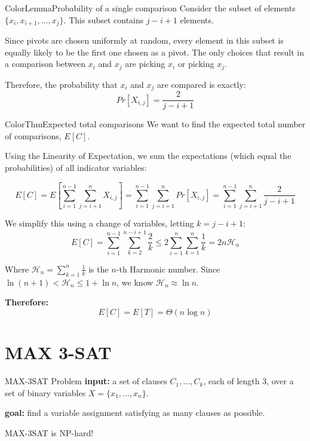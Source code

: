 \documentclass[a4paper, 11pt]{report}
\begin{document}
\begin{cframe}{ColorLemma}{Probability of a single comparison}
    Consider the subset of elements $\{x_i, x_{i+1}, \dots, x_j\}$. This subset contains $j - i + 1$ elements. 
    
    Since pivots are chosen uniformly at random, every element in this subset is equally likely to be the first one chosen as a pivot. The only choices that result in a comparison between $x_i$ and $x_j$ are picking $x_i$ or picking $x_j$. 
    
    Therefore, the probability that $x_i$ and $x_j$ are compared is exactly:
    $$Pr[X_{i,j}] = \frac{2}{j - i + 1}$$
\end{cframe}

\begin{cframe}{ColorThm}{Expected total comparisons}
    We want to find the expected total number of comparisons, $E[C]$. 

    Using the Linearity of Expectation, we sum the expectations (which equal the probabilities) of all indicator variables:
    
    $$E[C] = E\left[\sum_{i=1}^{n-1} \sum_{j=i+1}^n X_{i,j}\right] = \sum_{i=1}^{n-1} \sum_{j=i+1}^n Pr[X_{i,j}] = \sum_{i=1}^{n-1} \sum_{j=i+1}^n \frac{2}{j - i + 1}$$
    
    We simplify this using a change of variables, letting $k = j - i + 1$:
    $$E[C] = \sum_{i=1}^{n-1} \sum_{k=2}^{n-i+1} \frac{2}{k} \le 2 \sum_{i=1}^n \sum_{k=1}^n \frac{1}{k} = 2n\mathcal{H}_n$$
    
    Where $\mathcal{H}_n = \sum_{k=1}^n \frac{1}{k}$ is the $n$-th Harmonic number. Since $\ln(n+1) < \mathcal{H}_n \le 1 + \ln n$, we know $\mathcal{H}_n \approx \ln n$.
    
    \textbf{Therefore:} 
    $$E[C] = E[T] = \Theta(n \log n)$$
\end{cframe}


\section{MAX 3-SAT}

\begin{defframe}{MAX-3SAT Problem}{}
    \textbf{input:} a set of clauses $C_1, \dots, C_k$, each of length 3, over a set of binary variables $X = \{x_1, \dots, x_n\}$.
    
    \textbf{goal:} find a variable assignment satisfying as many clauses as possible. 
    
    \begin{gframe}{MAX-3SAT is NP-hard!}
    \end{gframe}
\end{defframe}
\end{document}
